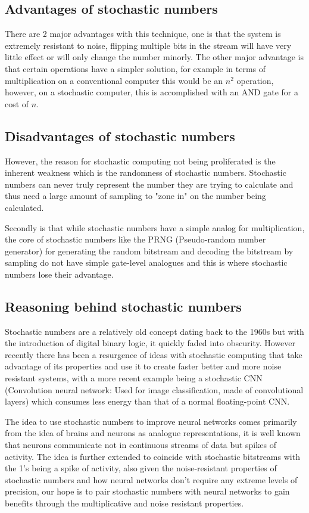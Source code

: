 \documentclass[a4paper,oneside,phd,etd]{BYUPhys}
\begin{document}
\subsection{Advantages of stochastic numbers}
There are 2 major advantages with this technique, one is that the system is extremely resistant to noise, flipping multiple bits in the stream will have very little effect or will only change the number minorly. The other major advantage is that certain operations have a simpler solution, for example in terms of multiplication on a conventional computer this would be an $n^2$ operation, however, on a stochastic computer, this is accomplished with an AND gate for a cost of $n$\cite{stochastic-computing-systems}.

\subsection{Disadvantages of stochastic numbers}
However, the reason for stochastic computing not being proliferated is the inherent weakness which is the randomness of stochastic numbers. Stochastic numbers can never truly represent the number they are trying to calculate and thus need a large amount of sampling to "zone in" on the number being calculated.

Secondly is that while stochastic numbers have a simple analog for multiplication, the core of stochastic numbers like the PRNG (Pseudo-random number generator) for generating the random bitstream and decoding the bitstream by sampling do not have simple gate-level analogues and this is where stochastic numbers lose their advantage.

\subsection{Reasoning behind stochastic numbers}
Stochastic numbers are a relatively old concept dating back to the 1960s but with the introduction of digital binary logic, it quickly faded into obscurity. However recently there has been a resurgence of ideas with stochastic computing that take advantage of its properties and use it to create faster better and more noise resistant systems, with a more recent example being a stochastic CNN (Convolution neural network: Used for image classification, made of convolutional layers) which consumes less energy than that of a normal floating-point CNN\cite{stochastic-cnn}.

The idea to use stochastic numbers to improve neural networks comes primarily from the idea of brains and neurons as analogue representations, it is well known that neurons communicate not in continuous streams of data but spikes of activity. The idea is further extended to coincide with stochastic bitstreams with the 1's being a spike of activity, also given the noise-resistant properties of stochastic numbers and how neural networks don't require any extreme levels of precision, our hope is to pair stochastic numbers with neural networks to gain benefits through the multiplicative and noise resistant properties.
\end{document}
